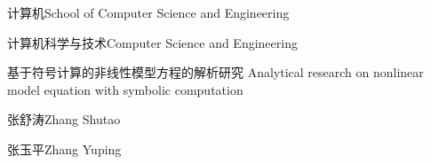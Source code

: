 
\school
{计算机}{School of Computer Science and Engineering}

\major
{计算机科学与技术}{Computer Science and Engineering}

\thesistitle
{基于符号计算的非线性模型方程的解析研究}
{ }
{Analytical research on nonlinear model equation with symbolic computation}

\thesisauthor
{张舒涛}{Zhang Shutao}

\teacher
{张玉平}{Zhang Yuping}


\thesisbegin{\ \ \ \ \ \ \ \ }{\ \ \ \ }{\ \ \ \ }

\thesisend{\ \ \ \ \ \ \ \ }{\ \ \ \ }{\ \ \ \ }



